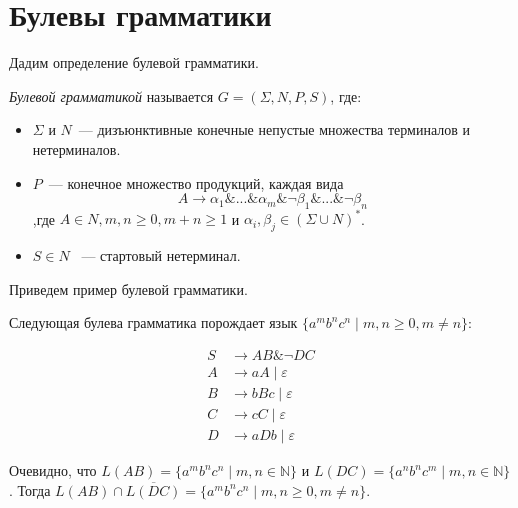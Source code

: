 \section{Булевы грамматики}
\label{sec:BooleanGrammars}

Дадим определение булевой грамматики.

\begin{definition}
    \textit{Булевой грамматикой} называется $G = (\Sigma,N,P,S)$, где:
    \begin{itemize}
        \item $\Sigma$ и $N$~--- дизъюнктивные конечные непустые множества терминалов и нетерминалов.
        \item $P$~--- конечное множество продукций, каждая вида
        \[
        A\rightarrow \alpha_1\&...\&\alpha_m\&\neg\beta_1\&...\&\neg\beta_n
        \]
        ,где $A \in N, m, n \ge 0, m+n \geq 1$ и $\alpha_i,\beta_j \in (\Sigma \cup N)^*$.
        \item $S \in N$ ~--- стартовый нетерминал.
    \end{itemize}
\end{definition}

Приведем пример булевой грамматики.

\begin{example}
    Следующая булева грамматика порождает язык  $\{a^mb^nc^n\mid m,n \geq 0, m \neq n \}$:
    
    \begin{align*}
    S   &\to A B \& \neg D C \\ 
    A  &\to a A \mid \varepsilon \\ 
    B &\to b B c \mid \varepsilon \\
    C   &\to c C \mid \varepsilon \\ 
    D   &\to aDb \mid \varepsilon
    \end{align*}
    
    Очевидно, что $L(AB) = \{a^mb^nc^n\mid m,n \in \mathbb{N}\}$ и $L(DC) = \{a^nb^nc^m\mid m,n \in \mathbb{N}\}$. Тогда $L(AB)\cap\overline{L(DC)} = \{a^mb^nc^n\mid m,n \geq 0, m \neq n \}$.
\end{example}

